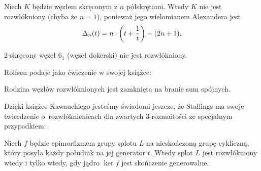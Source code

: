 \begin{example}
%
    Niech $K$ będzie węzłem skręconym z $n$ półskrętami.
    Wtedy $K$ nie jest rozwłókniony (chyba że $n = 1$), ponieważ jego wielomianem Alexandera jest
%
    \begin{equation}
        \Delta_n(t) = n \cdot \left(t + \frac 1 t \right) - (2n+1).
    \end{equation}
\end{example}

\begin{corollary}
    $2$-skręcony węzeł $6_1$ (węzeł dokerski) nie jest rozwłókniony.
\end{corollary}

Rolfsen \cite[s. 326]{rolfsen1976} podaje jako ćwiczenie w swojej książce:

\begin{proposition}
%
    Rodzina węzłów rozwłóknionych jest zamknięta na branie sum spójnych.
\end{proposition}

Dzięki książce Kawauchiego \cite[s. 84]{kawauchi1996} jesteśmy świadomi jeszcze, że Stallings ma swoje twierdzenie o~rozwłóknienieach dla zwartych 3-rozmaitości ze specjalnym przypadkiem:
%
\begin{proposition}
    Niech $f$ będzie epimorfizmem grupy splotu $L$ na nieskończoną grupę cykliczną, który posyła każdy południk na jej generator $t$. %
    Wtedy splot $L$ jest rozwłókniony wtedy i tylko wtedy, gdy jądro $\ker f$ jest skończenie generowalne.
\end{proposition}

%



